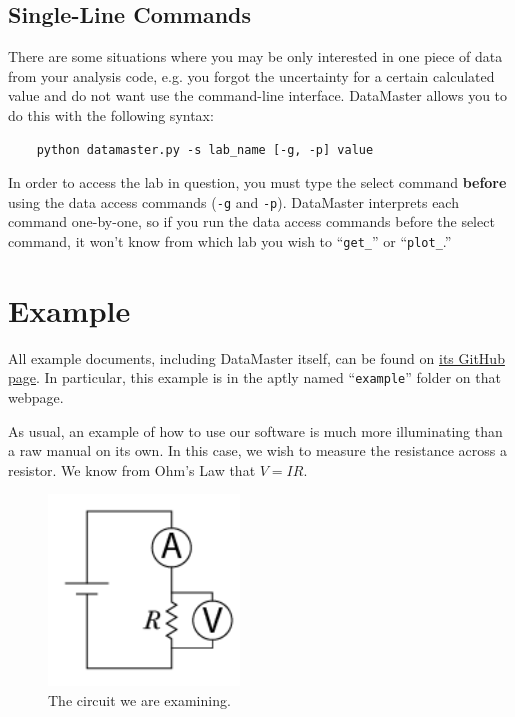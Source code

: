 \documentclass[12pt]{article}
\begin{document}
{\subsection*{Single-Line Commands}

There are some situations where you may be only interested in one piece of data from your analysis code, e.g. you forgot the uncertainty for a certain calculated value and do not want use the command-line interface. DataMaster allows you to do this with the following syntax:
\begin{framed}
  \begin{lstlisting}
    python datamaster.py -s lab_name [-g, -p] value
  \end{lstlisting}
\end{framed}
In order to access the lab in question, you must type the select command \textbf{before} using the data access commands (\texttt{-g} and \texttt{-p}). DataMaster interprets each command one-by-one, so if you run the data access commands before the select command, it won't know from which lab you wish to ``\texttt{get\_}'' or ``\texttt{plot\_}.''

\section*{Example}
\label{sec:example}

All example documents, including DataMaster itself, can be found on \href{https://github.com/nyuphys/DataMaster/}{its GitHub page}. In particular, this example is in the aptly named ``\texttt{example}'' folder on that webpage.

As usual, an example of how to use our software is much more illuminating than a raw manual on its own. In this case, we wish to measure the resistance across a resistor. We know from Ohm's Law that $V = IR$. 

\begin{figure}[!ht]
  \centering
    \includegraphics[width=2in]{assets/circuit.png}
  \caption{\textsf{The circuit we are examining.}}
  \label{fig:ex_circuit}
\end{figure}

}
\end{document}
